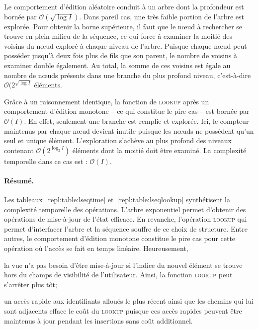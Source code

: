 \noindent Le comportement d'édition aléatoire conduit à un arbre dont la
profondeur est bornée par $\mathcal{O}(\sqrt{\log I})$. Dans pareil cas, une
très faible portion de l'arbre est explorée. Pour obtenir la borne supérieure,
il faut que le nœud à rechercher se trouve en plein milieu de la séquence, ce
qui force à examiner la moitié des voisins du nœud exploré à chaque niveau de
l'arbre. Puisque chaque nœud peut posséder jusqu'à deux fois plus de fils que
son parent, le nombre de voisins à examiner double également. Au total, la somme
de ces voisins est égale au nombre de nœuds présents dans une branche du plus
profond niveau, c'est-à-dire $\mathcal{O}(2^{\sqrt{\log I}}$ éléments.

\noident Grâce à un raisonnement identique, la fonction de \textsc{lookup} après
un comportement d'édition monotone -- ce qui constitue le pire cas -- est bornée
par $\mathcal{O}(I)$. En effet, seulement une branche est remplie et
explorée. Ici, le compteur maintenus par chaque nœud devient inutile puisque les
nœuds ne possèdent qu'un seul et unique élément. L'exploration s'achève au plus
profond des niveaux contenant $\mathcal{O}(2^{\log_2 I})$ éléments dont la
moitié doit être examiné. La complexité temporelle dans ce cas est :
$\mathcal{O}(I)$.

\paragraph{Résumé.} Les tableaux~\ref{repl:table:lseqtime}
et~\ref{repl:table:lseqlookup} synthétisent la complexité temporelle des
opérations. L'arbre exponentiel permet d'obtenir des opérations de mise-à-jour
de l'état efficace. En revanche, l'opération \textsc{lookup} qui permet
d'interfacer l'arbre et la séquence souffre de ce choix de structure. Entre
autres, le comportement d'édition monotone constitue le pire cas pour cette
opération où l'accès se fait en temps linéaire. Heureusement, 
\begin{inparaenum}[(i)]
\item la vue n'a pas besoin d'être mise-à-jour si l'indice du nouvel élément se
  trouve hors du champs de visibilité de l'utilisateur. Ainsi, la fonction
  \textsc{lookup} peut s'arrêter plus tôt;
\item un accès rapide aux identifiants alloués le plus récent ainsi que les
  chemins qui lui sont adjacents efface le coût du \textsc{lookup} puisque ces
  accès rapides peuvent être maintenus à jour pendant les insertions sans coût
  additionnel.
\end{inparaenum}

